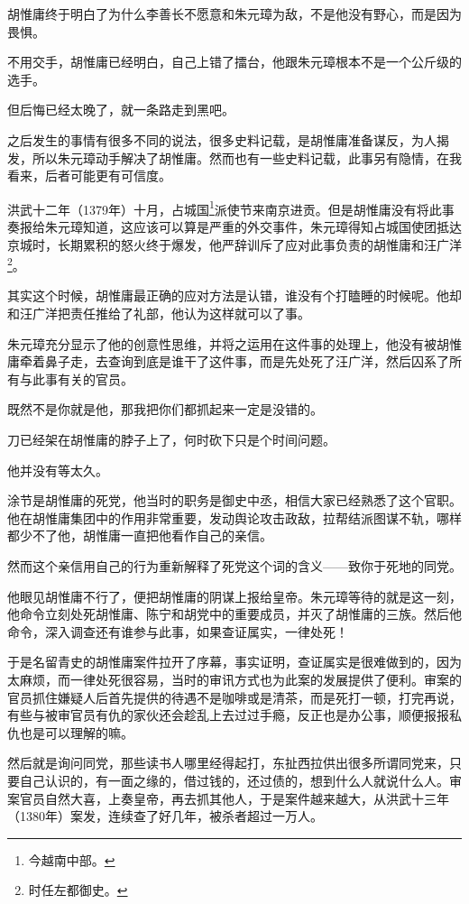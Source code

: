 \begin{multicols}{\theparacolNo}
		胡惟庸终于明白了为什么李善长不愿意和朱元璋为敌，不是他没有野心，而是因为畏惧。

		不用交手，胡惟庸已经明白，自己上错了擂台，他跟朱元璋根本不是一个公斤级的选手。

		但后悔已经太晚了，就一条路走到黑吧。

		之后发生的事情有很多不同的说法，很多史料记载，是胡惟庸准备谋反，为人揭发，所以朱元璋动手解决了胡惟庸。然而也有一些史料记载，此事另有隐情，在我看来，后者可能更有可信度。

		洪武十二年（1379年）十月，占城国\footnote{今越南中部。}派使节来南京进贡。但是胡惟庸没有将此事奏报给朱元璋知道，这应该可以算是严重的外交事件，朱元璋得知占城国使团抵达京城时，长期累积的怒火终于爆发，他严辞训斥了应对此事负责的胡惟庸和汪广洋\footnote{时任左都御史。}。

		其实这个时候，胡惟庸最正确的应对方法是认错，谁没有个打瞌睡的时候呢。他却和汪广洋把责任推给了礼部，他认为这样就可以了事。

		朱元璋充分显示了他的创意性思维，并将之运用在这件事的处理上，他没有被胡惟庸牵着鼻子走，去查询到底是谁干了这件事，而是先处死了汪广洋，然后囚系了所有与此事有关的官员。

		既然不是你就是他，那我把你们都抓起来一定是没错的。

		刀已经架在胡惟庸的脖子上了，何时砍下只是个时间问题。

		他并没有等太久。

		涂节是胡惟庸的死党，他当时的职务是御史中丞，相信大家已经熟悉了这个官职。他在胡惟庸集团中的作用非常重要，发动舆论攻击政敌，拉帮结派图谋不轨，哪样都少不了他，胡惟庸一直把他看作自己的亲信。

		然而这个亲信用自己的行为重新解释了死党这个词的含义——致你于死地的同党。

		他眼见胡惟庸不行了，便把胡惟庸的阴谋上报给皇帝。朱元璋等待的就是这一刻，他命令立刻处死胡惟庸、陈宁和胡党中的重要成员，并灭了胡惟庸的三族。然后他命令，深入调查还有谁参与此事，如果查证属实，一律处死！

		于是名留青史的胡惟庸案件拉开了序幕，事实证明，查证属实是很难做到的，因为太麻烦，而一律处死很容易，当时的审讯方式也为此案的发展提供了便利。审案的官员抓住嫌疑人后首先提供的待遇不是咖啡或是清茶，而是死打一顿，打完再说，有些与被审官员有仇的家伙还会趁乱上去过过手瘾，反正也是办公事，顺便报报私仇也是可以理解的嘛。

		然后就是询问同党，那些读书人哪里经得起打，东扯西拉供出很多所谓同党来，只要自己认识的，有一面之缘的，借过钱的，还过债的，想到什么人就说什么人。审案官员自然大喜，上奏皇帝，再去抓其他人，于是案件越来越大，从洪武十三年（1380年）案发，连续查了好几年，被杀者超过一万人。


\end{multicols}
